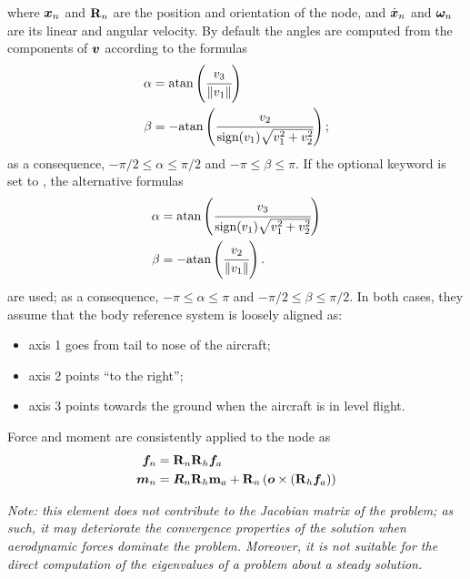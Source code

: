 where $\boldsymbol{x}_n$ and $\bm{\mathbf R}_n$ are the position and orientation
of the node, and $\dot{\boldsymbol{x}}_n$ and $\boldsymbol{\omega}_n$ are its linear
and angular velocity.
By default the angles are computed from the components of $\boldsymbol{v}$
according to the formulas
\begin{subequations}
\begin{align}
	\alpha
	&=
	\text{atan}\left( 
		\cfrac{v_3}{\left\| v_1 \right\|}
	 \right)
	\\
	\beta
	&=
	-\text{atan}\left( 
		\cfrac{v_2}{\text{sign}(v_1)\sqrt{v_1^2 + v_2^2}}
	 \right)
	;
\end{align}
\end{subequations}
as a consequence, $-\pi/2 \le \alpha \le \pi/2$
and $-\pi \le \beta \le \pi$.
If the optional keyword  is set to ,
the alternative formulas
\begin{subequations}
\begin{align}
	\alpha
	&=
	\text{atan}\left( 
		\cfrac{v_3}{\text{sign}(v_1)\sqrt{v_1^2 + v_2^2}}
	 \right)
	\\
	\beta
	&=
	-\text{atan}\left( 
		\cfrac{v_2}{\left\| v_1 \right\|}
	 \right)
	.
\end{align}
\end{subequations}
are used; as a consequence, $-\pi \le \alpha \le \pi$
and $-\pi/2 \le \beta \le \pi/2$.
In both cases, they assume that the body reference system
is loosely aligned as:
\begin{itemize}
\item axis 1 goes from tail to nose of the aircraft;
\item axis 2 points ``to the right'';
\item axis 3 points towards the ground when the aircraft is in level flight.
\end{itemize}
Force and moment are consistently applied to the node as
\begin{subequations}
\begin{align}
	\boldsymbol{f}_n &= \bm{\mathbf R}_n \bm{\mathbf R}_h \boldsymbol{f}_a
	\\
	\boldsymbol{m}_n &= \boldsymbol{R}_n \bm{\mathbf R}_h \bm{\mathbf m}_a
		+ \bm{\mathbf R}_n \left( \boldsymbol{o} \times \left( \bm{\mathbf R}_h \boldsymbol{f}_a \right) \right)
\end{align}
\end{subequations}

\emph{Note: this element does not contribute to the Jacobian matrix
of the problem; as such, it may deteriorate the convergence properties
of the solution when aerodynamic forces dominate the problem.
Moreover, it is not suitable for the direct computation of the eigenvalues
of a problem about a steady solution.}

